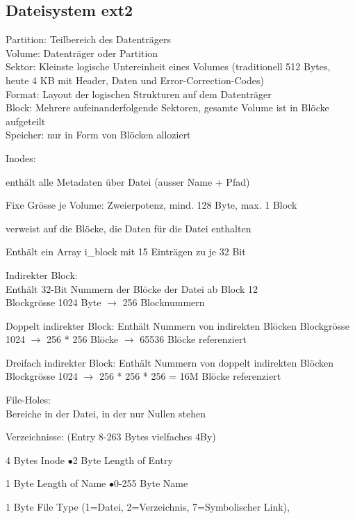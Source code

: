 \begin{multicols*}{5}
\vfill
\columnbreak



\section{Dateisystem ext2}

\textcolor{h}{Partition:} Teilbereich des Datenträgers\\
\textcolor{h}{Volume:} Datenträger oder Partition\\
\textcolor{h}{Sektor:} Kleinste logische Untereinheit eines Volumes (traditionell 512 Bytes, heute 4 KB mit Header, Daten und Error-Correction-Codes)\\
\textcolor{h}{Format:} Layout der logischen Strukturen auf dem Datenträger\\
\textcolor{h}{Block:} Mehrere aufeinanderfolgende Sektoren, gesamte Volume ist in Blöcke aufgeteilt\\
\textcolor{h}{Speicher:} nur in Form von Blöcken alloziert

\textcolor{h}{Inodes}: 
\begin{compactitem}[$\bullet$]
	\item enthält alle Metadaten über Datei (ausser Name + Pfad)
	\item Fixe Grösse je Volume: Zweierpotenz, mind. 128 Byte, max. 1 Block
	\item verweist auf die Blöcke, die Daten für die Datei enthalten
	\item Enthält ein Array i\_block mit 15 Einträgen zu je 32 Bit
\end{compactitem}

\textcolor{h}{Indirekter Block}: \\
Enthält 32-Bit Nummern der Blöcke der Datei ab Block 12\\
Blockgrösse 1024 Byte $\rightarrow$ 256 Blocknummern

\textcolor{h}{Doppelt indirekter Block}:
Enthält Nummern von indirekten Blöcken 
Blockgrösse 1024 $\rightarrow$ 256 * 256 Blöcke $\rightarrow$ 65536 Blöcke referenziert

\textcolor{h}{Dreifach indirekter Block}:
Enthält Nummern von doppelt indirekten Blöcken 
Blockgrösse 1024 $\rightarrow$ 256 * 256 * 256 = 16M Blöcke referenziert


\textcolor{h}{File-Holes:}\\
Bereiche in der Datei, in der nur Nullen stehen


\textcolor{h}{Verzeichnisse:} (Entry 8-263 Bytes vielfaches 4By)
\begin{compactitem}[$\bullet$]
	\item 4 Bytes Inode $\bullet$2 Byte Length of Entry
	\item 1 Byte Length of Name $\bullet$0-255 Byte Name
	\item 1 Byte File Type (1=Datei, 2=Verzeichnis, 7=Symbolischer Link), 
\end{compactitem}


\end{multicols*}
